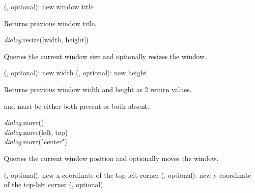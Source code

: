 \documentclass[a4paper,12pt,twoside,extrafontsizes]{memoir}
\begin{document}
\begin{funcparams}
	 (, optional): new window title
\end{funcparams}

\begin{funcret}
	Returns previous window title.
\end{funcret}


\begin{luafuncprototype}
\emph{dialog}.resize([width, height])
\end{luafuncprototype}

\begin{funcdescr}
	Queries the current window size and optionally resizes the window.
\end{funcdescr}

\begin{funcparams}
	 (, optional): new width
	 (, optional): new height
\end{funcparams}

\begin{funcret}
	Returns previous window width and height as 2 return values.
\end{funcret}

\begin{funcremarks}
	 and  must be either both present or both absent.
\end{funcremarks}


\begin{luafuncprototype}
\emph{dialog}.move()\\
\emph{dialog}.move(left, top)\\
\emph{dialog}.move("center")
\end{luafuncprototype}

\begin{funcdescr}
	Queries the current window position and optionally moves the window.
\end{funcdescr}

\begin{funcparams}
	 (, optional): new x coordinate of the top-left corner
	 (, optional): new y coordinate of the top-left corner
	 (, optional)
\end{funcparams}
\end{document}
